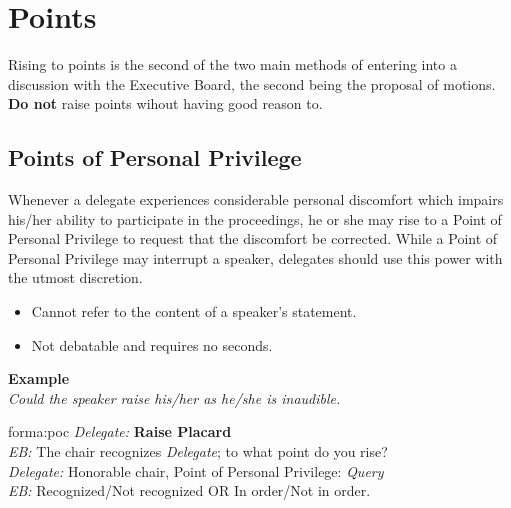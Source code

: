 \chapter{Points}
Rising to points is the second of the two main methods of entering into a discussion with the Executive Board, the second being the proposal of motions.
\textbf{Do not} raise points wihout having good reason to.
\section{Points of Personal Privilege}
Whenever a delegate experiences considerable personal discomfort which impairs his/her ability to participate in the proceedings, he or she may rise to a Point of Personal Privilege to request that the discomfort be corrected. While a Point of Personal Privilege may interrupt a speaker, delegates should use this power with the 
utmost discretion.
\begin{itemize}
	\item Cannot refer to the content of a speaker's statement.
	\item Not debatable and requires no seconds.
\end{itemize}
\textbf{Example}\\
\textit{Could the speaker raise his/her as he/she is inaudible.}
\begin{note}[Format]{forma:poc}
\emph{Delegate:} \textbf{Raise Placard} \\
\emph{EB:} The \Gls{chair} recognizes \emph{Delegate}; to what point do you rise? \\
\emph{Delegate:} Honorable \Gls{chair}, Point of Personal Privilege: \emph{Query} \\
\emph{EB:} Recognized/Not recognized OR In order/Not in order. \\
\end{note}

